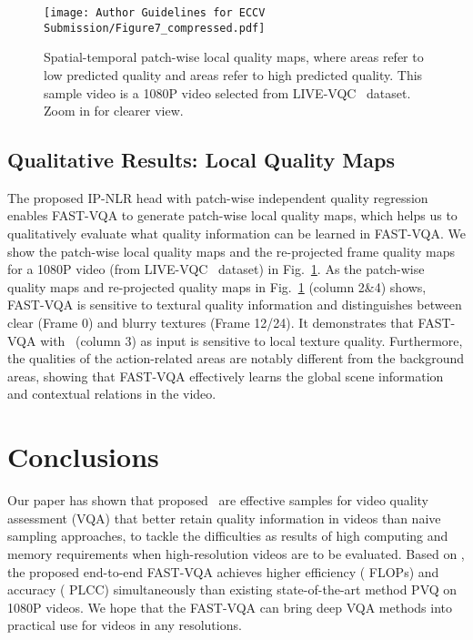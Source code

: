 \documentclass[runningheads]{llncs}
\begin{document}
\begin{figure}[]
    \centering
    \texttt{[image: Author Guidelines for ECCV Submission/Figure7\_compressed.pdf]}
    \vspace{-12pt}
    \caption{Spatial-temporal patch-wise local quality maps, where \textbf{} areas refer to low predicted quality and \textbf{} areas refer to high predicted quality. This sample video is a 1080P video selected from LIVE-VQC~\cite{vqc} dataset. Zoom in for clearer view.}
    \label{fig:6}
    \vspace{-16pt}
\end{figure}

\subsection{Qualitative Results: Local Quality Maps}

 The proposed IP-NLR head with patch-wise independent quality regression enables FAST-VQA to generate patch-wise local quality maps, which helps us to qualitatively evaluate what quality information can be learned in FAST-VQA. We show the patch-wise local quality maps and the re-projected frame quality maps for a 1080P video (from LIVE-VQC~\cite{vqc} dataset) in Fig.~\ref{fig:6}. As the patch-wise quality maps and re-projected quality maps in Fig.~\ref{fig:6} (column 2\&4) shows, FAST-VQA is sensitive to textural quality information and distinguishes between clear (Frame 0) and blurry textures (Frame 12/24). It demonstrates that FAST-VQA with \frag~(column 3) as input is sensitive to local texture quality. Furthermore, the qualities of the action-related areas are notably different from the background areas, showing that FAST-VQA effectively learns the global scene information and contextual relations in the video.

\section{Conclusions}

Our paper has shown that proposed \frag~are effective samples for video quality assessment (VQA) that better retain quality information in videos than naive sampling approaches, to tackle the difficulties as results of high computing and memory requirements when high-resolution videos are to be evaluated. Based on \frag, the proposed end-to-end FAST-VQA achieves higher efficiency ( FLOPs) and accuracy ( PLCC) simultaneously than existing state-of-the-art method PVQ on 1080P videos. We hope that the FAST-VQA can bring deep VQA methods into practical use for videos in any resolutions.
\end{document}
